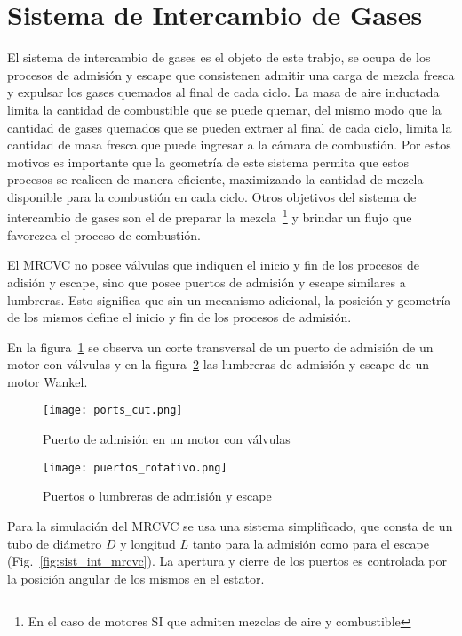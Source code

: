 \section{Sistema de Intercambio de Gases}
%
El sistema de intercambio de gases es el objeto de este trabjo, se ocupa de los
procesos de admisión y escape que consistenen admitir una carga de mezcla
fresca y expulsar los gases quemados al final de cada ciclo.
%
La masa de aire inductada limita la cantidad de combustible que se puede
quemar, del mismo modo que la cantidad de gases quemados que se pueden extraer
al final de cada ciclo, limita la cantidad de masa fresca que puede ingresar a
la cámara de combustión.
%
Por estos motivos es importante que la geometría de este sistema permita que
estos procesos se realicen de manera eficiente, maximizando la cantidad de mezcla
disponible para la combustión en cada ciclo.
%
Otros objetivos del sistema de intercambio de gases son el de preparar la
mezcla~\footnote{En el caso de motores SI que admiten mezclas de aire y
combustible} y brindar un flujo que favorezca el proceso de combustión.



El MRCVC no posee válvulas que indiquen el inicio y fin de los procesos
de adisión y escape, sino que posee puertos de admisión y escape similares a
lumbreras.
%
Esto significa que sin un mecanismo adicional, la posición y geometría de los
mismos define el inicio y fin de los procesos de admisión.

En la figura~\ref{fig:valvulas} se observa un corte transversal de un puerto de
admisión de un motor con válvulas y en la figura~\ref{fig:puertos} las
lumbreras de admisión y escape de un motor Wankel.

\begin{figure} \centering
    \texttt{[image: ports\_cut.png]}
    \caption{Puerto de admisión en un motor con válvulas}\label{fig:valvulas}
\end{figure}

\begin{figure} \centering
    \texttt{[image: puertos\_rotativo.png]}
    \caption{Puertos o lumbreras de admisión y escape}\label{fig:puertos}
\end{figure}

Para la simulación del MRCVC se usa una sistema simplificado, que consta de un
tubo de diámetro $D$ y longitud $L$ tanto para la admisión como para el escape
(Fig.~\ref{fig:sist_int_mrcvc}).
%
La apertura y cierre de los puertos es controlada por la posición angular de
los mismos en el estator.

